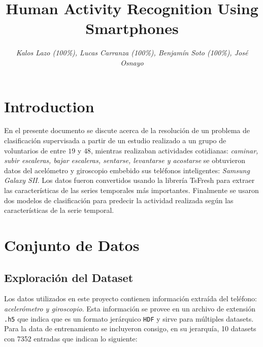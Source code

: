 \documentclass[conference]{IEEEtran}
\begin{document}
    \title{Human Activity Recognition Using Smartphones\\}

    \author{\textit{Kalos Lazo (100\%), Lucas Carranza (100\%), Benjamín Soto (100\%), José Osnayo}}
\maketitle

\section{Introduction}
En el presente documento se discute acerca de la resolución de un problema de clasificación supervisada a partir de un estudio realizado a un grupo de voluntarios de entre $19$ y $48$, mientras realizaban actividades cotidianas: \textit{caminar, subir escaleras, bajar escaleras, sentarse, levantarse y acostarse} se obtuvieron datos del acelómetro y giroscopio embebido sus teléfonos inteligentes: \textit{Samsung Galaxy SII}. Los datos fueron convertidos usando la librería TsFresh para extraer las características de las series temporales más importantes. Finalmente se usaron dos modelos de clasificación para predecir la actividad realizada según las características de la serie temporal.

\section{Conjunto de Datos}
\subsection{Exploración del Dataset}
Los datos utilizados en este proyecto contienen información extraída del teléfono: \textit{acelerómetro y giroscopio}. Esta información se provee en un archivo de extensión \texttt{.h5} que indica que es un formato jerárquico \texttt{HDF} y sirve para múltiples datasets. Para la data de entrenamiento se incluyeron consigo, en su jerarquía, 10 datasets con 7352 entradas que indican lo siguiente:
\end{document}
